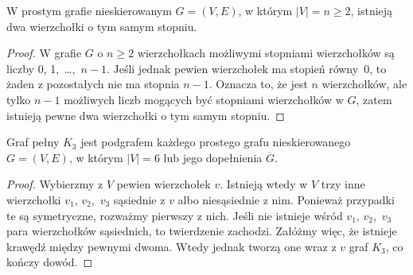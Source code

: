 \subproblem %
\begin{twierdzenie}
	W prostym grafie nieskierowanym $G=(V,E)$, w którym $|V|=n\ge2$, istnieją dwa wierzchołki o tym samym stopniu.
\end{twierdzenie}
\begin{proof}
W grafie $G$ o $n\ge2$ wierzchołkach możliwymi stopniami wierzchołków są liczby 0, 1,~\dots,~$n-1$. Jeśli jednak pewien wierzchołek ma stopień równy~0, to żaden z pozostałych nie ma stopnia $n-1$. Oznacza to, że jest $n$ wierzchołków, ale tylko $n-1$ możliwych liczb mogących być stopniami wierzchołków w $G$, zatem istnieją pewne dwa wierzchołki o tym samym stopniu.
\end{proof}

\subproblem %
\begin{twierdzenie}
	Graf pełny $K_3$ jest podgrafem każdego prostego grafu nieskierowanego $G=(V,E)$, w którym $|V|=6$ lub jego dopełnienia $\overline{G}$.
\end{twierdzenie}
\begin{proof}
Wybierzmy z $V$ pewien wierzchołek $v$. Istnieją wtedy w $V$ trzy inne wierzchołki $v_1$, $v_2$,~$v_3$ sąsiednie z $v$ albo niesąsiednie z nim. Ponieważ przypadki te są symetryczne, rozważmy pierwszy z nich. Jeśli nie istnieje wśród $v_1$, $v_2$,~$v_3$ para wierzchołków sąsiednich, to twierdzenie zachodzi. Załóżmy więc, że istnieje krawędź między pewnymi dwoma. Wtedy jednak tworzą one wraz z $v$ graf $K_3$, co kończy dowód.
\end{proof}

